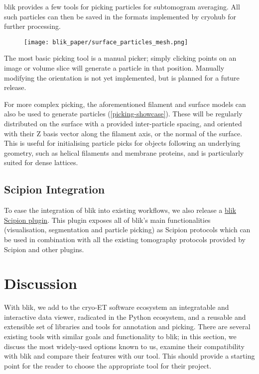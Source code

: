 blik provides a few tools for picking particles for subtomogram averaging. All such particles can then be saved in the formats implemented by cryohub for further processing.

\begin{figure}[!ht]
    \centering
    \texttt{[image: blik\_paper/surface\_particles\_mesh.png]}
    \label{picking-showcase}
\end{figure}

The most basic picking tool is a manual picker; simply clicking points on an image or volume slice will generate a particle in that position. Manually modifying the orientation is not yet implemented, but is planned for a future release.

For more complex picking, the aforementioned filament and surface models can also be used to generate particles (\autoref{picking-showcase}). These will be regularly distributed on the surface with a provided inter-particle spacing, and oriented with their Z basis vector along the filament axis, or the normal of the surface. This is useful for initialising particle picks for objects following an underlying geometry, such as helical filaments and membrane proteins, and is particularly suited for dense lattices.

\subsection{Scipion Integration}\label{scipion-integration}

To ease the integration of blik into existing workflows, we also release a \href{https://github.com/scipion-em/scipion-em-blik}{blik Scipion plugin}. This plugin exposes all of blik's main functionalities (visualisation, segmentation and particle picking) as Scipion protocols which can be used in combination with all the existing tomography protocols provided by Scipion and other plugins.

\section{Discussion}
With blik, we add to the cryo-ET software ecosystem an integratable and interactive data viewer, radicated in the Python ecosystem, and a reusable and extensible set of libraries and tools for annotation and picking. There are several existing tools with similar goals and functionality to blik; in this section, we discuss the most widely-used options known to us, examine their compatibility with blik and compare their features with our tool. This should provide a starting point for the reader to choose the appropriate tool for their project.

